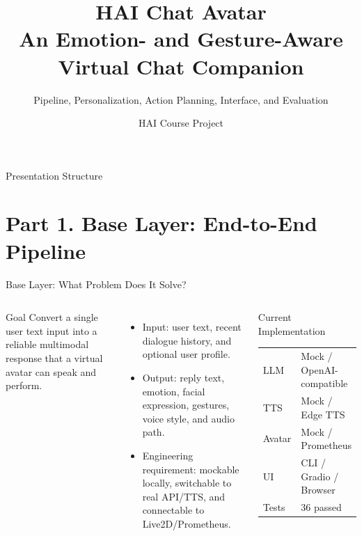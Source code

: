 \documentclass[aspectratio=169]{beamer}
\title[HAI Chat Avatar]{HAI Chat Avatar\\An Emotion- and Gesture-Aware Virtual Chat Companion}
\subtitle{Pipeline, Personalization, Action Planning, Interface, and Evaluation}
\author{HAI Course Project}
\institute{Base Layer + Innovation Layer + Personalization Layer}
\begin{document}
\begin{frame}
  \titlepage
\end{frame}

\begin{frame}{Presentation Structure}
  \tableofcontents
\end{frame}

\section{Part 1. Base Layer: End-to-End Pipeline}

\begin{frame}{Base Layer: What Problem Does It Solve?}
  \begin{columns}[T,onlytextwidth]
    \begin{block}{Goal}
      Convert a single user text input into a reliable multimodal response that a virtual avatar can speak and perform.
    \end{block}
    \vspace{0.2cm}
    \begin{itemize}
      \item Input: user text, recent dialogue history, and optional user profile.
      \item Output: reply text, emotion, facial expression, gestures, voice style, and audio path.
      \item Engineering requirement: mockable locally, switchable to real API/TTS, and connectable to Live2D/Prometheus.
    \end{itemize}
    \begin{block}{Current Implementation}
      \begin{tabular}{ll}
        LLM & Mock / OpenAI-compatible \\
        TTS & Mock / Edge TTS \\
        Avatar & Mock / Prometheus \\
        UI & CLI / Gradio / Browser\\
        Tests & 36 passed \\
      \end{tabular}
    \end{block}
  \end{columns}
\end{frame}
\end{document}

